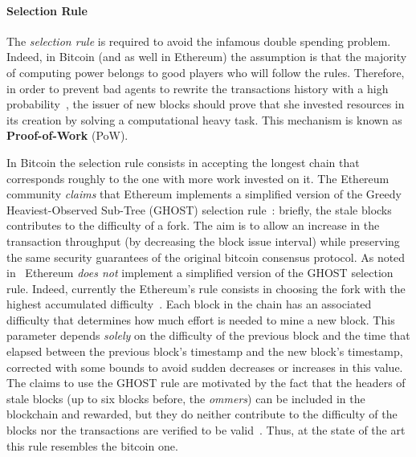 \paragraph{Selection Rule}
The \emph{selection rule} is required to avoid the infamous double spending
problem. Indeed, in Bitcoin (and as well in Ethereum) the assumption is that the
majority of computing power belongs to good players who will follow the rules.
Therefore, in order to prevent bad agents to rewrite the transactions history
with a high probability~\cite{bib:bitcoin}, the issuer of new blocks should
prove that she invested resources in its creation by solving a computational
heavy task. This mechanism is known as \textbf{Proof-of-Work} (PoW).



In Bitcoin
the selection rule consists in accepting the longest chain that corresponds
roughly to the one with more work invested on it.
The Ethereum
community \emph{claims} that Ethereum implements a simplified version of the
Greedy Heaviest-Observed Sub-Tree (GHOST) selection
rule~\cite{wood2018ethereum}:
briefly, the stale blocks contributes to the difficulty of a fork.
The aim is to allow an increase in the transaction throughput (by decreasing
the block issue interval) while preserving the same security guarantees of the
original bitcoin consensus protocol.
As noted in~\cite{bib:securityAndScalabilityPoW} Ethereum \emph{does not}
implement a simplified version of the GHOST selection rule.
Indeed,
currently the Ethereum's rule consists in choosing the fork with the
highest accumulated difficulty~\cite{wood2018ethereum}.
Each block in the chain has an
associated difficulty that determines how much effort is needed to mine a new
block. This parameter depends \emph{solely} on the difficulty of the previous
block and the time that elapsed between the previous block's timestamp and the
new block's timestamp, corrected with some bounds to avoid sudden decreases or
increases in this value. The claims to use the GHOST rule are motivated by the
fact that the headers of stale blocks (up to six blocks before, the
\emph{ommers}) can be included in the blockchain and rewarded, but they do
neither contribute to the difficulty of the blocks nor the transactions are
verified to be valid~\cite{bib:securityAndScalabilityPoW}. Thus, at the state
of the art this rule resembles the bitcoin one.





